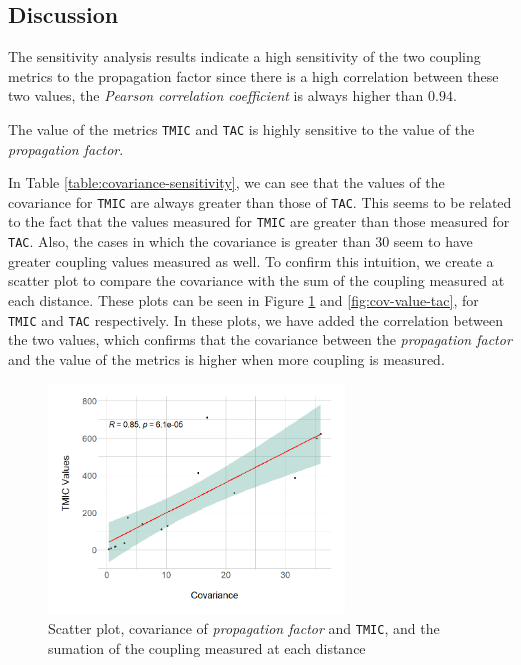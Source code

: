 \subsection{Discussion}
The sensitivity analysis results indicate a high sensitivity of the two coupling metrics to the propagation factor since there is a high correlation between these two values, the \textit{Pearson correlation coefficient} is always higher than $0.94$.

\begin{finding}
	The value of the metrics \texttt{TMIC} and \texttt{TAC} is highly sensitive to the value of the \textit{propagation factor}.
	\label{find:high-sensitivity}
\end{finding}

In Table \ref{table:covariance-sensitivity}, we can see that the values of the covariance for \texttt{TMIC} are always greater than those of \texttt{TAC}. This seems to be related to the fact that the values measured for \texttt{TMIC} are greater than those measured for \texttt{TAC}. Also, the cases in which the covariance is greater than $30$ seem to have greater coupling values measured as well. To confirm this intuition, we create a scatter plot to compare the covariance with the sum of the coupling measured at each distance. These plots can be seen in Figure \ref{fig:cov-value-tmic} and \ref{fig:cov-value-tac}, for \texttt{TMIC} and \texttt{TAC} respectively. In these plots, we have added the correlation between the two values, which confirms that the covariance between the \textit{propagation factor} and the value of the metrics is higher when more coupling is measured.

\begin{figure}[ht!]
\begin{center}
\includegraphics[width=0.7\textwidth]{figures/results/covariance-values-tmic.png}
\caption{Scatter plot, covariance of \textit{propagation factor} and \texttt{TMIC}, and the sumation of the coupling measured at each distance}
\label{fig:cov-value-tmic}
\end{center}
\end{figure}


